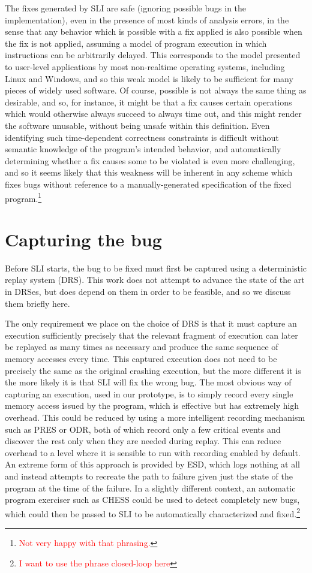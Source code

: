 \documentclass[10pt,twocolumn,preprint,natbib,authoryear]{sigplanconf}
\newcommand{\editorial}[1]{\textcolor{red}{\footnote{\textcolor{red}{#1}}}}
\begin{document}
The fixes generated by SLI are safe (ignoring possible bugs in the
implementation), even in the presence of most kinds of analysis
errors, in the sense that any behavior which is possible with a fix
applied is also possible when the fix is not applied, assuming a model
of program execution in which instructions can be arbitrarily delayed.
This corresponds to the model presented to user-level applications by
most non-realtime operating systems, including Linux and Windows, and
so this weak model is likely to be sufficient for many pieces of
widely used software.  Of course, possible is not always the same
thing as desirable, and so, for instance, it might be that a fix
causes certain operations which would otherwise always succeed to
always time out, and this might render the software unusable, without
being unsafe within this definition.  Even identifying such
time-dependent correctness constraints is difficult without semantic
knowledge of the program's intended behavior, and automatically
determining whether a fix causes some to be violated is even more
challenging, and so it seems likely that this weakness will be
inherent in any scheme which fixes bugs without reference to a
manually-generated specification of the fixed program.\editorial{Not
  very happy with that phrasing.}

\section{Capturing the bug}

Before SLI starts, the bug to be fixed must first be captured using a
deterministic replay system (DRS).  This work does not attempt to
advance the state of the art in DRSes, but does depend on them in
order to be feasible, and so we discuss them briefly here.

The only requirement we place on the choice of DRS is that it must
capture an execution sufficiently precisely that the relevant fragment
of execution can later be replayed as many times as necessary and
produce the same sequence of memory accesses every time.  This
captured execution does not need to be precisely the same as the
original crashing execution, but the more different it is the more
likely it is that SLI will fix the wrong bug.  The most obvious way of
capturing an execution, used in our prototype, is to simply record
every single memory access issued by the program, which is effective
but has extremely high overhead.  This could be reduced by using a
more intelligent recording mechanism such as PRES\cite{Park2009} or
ODR\cite{Altekar2009}, both of which record only a few critical events
and discover the rest only when they are needed during replay.  This
can reduce overhead to a level where it is sensible to run with
recording enabled by default.  An extreme form of this approach is
provided by ESD\cite{Zamfir2010}, which logs nothing at all and
instead attempts to recreate the path to failure given just the state
of the program at the time of the failure.  In a slightly different
context, an automatic program exerciser such as
CHESS\cite{Musuvathi2008} could be used to detect completely new bugs,
which could then be passed to SLI to be automatically characterized
and fixed.\editorial{I want to use the phrase closed-loop here}
\end{document}
